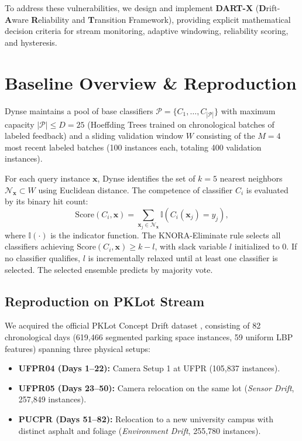 \documentclass[conference,10pt]{IEEEtran}
\begin{document}
To address these vulnerabilities, we design and implement \textbf{DART-X} (\textbf{D}rift-\textbf{A}ware \textbf{R}eliability and \textbf{T}ransition Framework), providing explicit mathematical decision criteria for stream monitoring, adaptive windowing, reliability scoring, and hysteresis.

\section{Baseline Overview \& Reproduction}
\label{sec:baseline}
Dynse \cite{almeida2018adapting} maintains a pool of base classifiers $\mathcal{P} = \{C_1, \dots, C_{|\mathcal{P}|}\}$ with maximum capacity $|\mathcal{P}| \le D = 25$ (Hoeffding Trees trained on chronological batches of labeled feedback) and a sliding validation window $W$ consisting of the $M = 4$ most recent labeled batches (100 instances each, totaling 400 validation instances).

For each query instance $\mathbf{x}$, Dynse identifies the set of $k = 5$ nearest neighbors $\mathcal{N}_{\mathbf{x}} \subset W$ using Euclidean distance. The competence of classifier $C_i$ is evaluated by its binary hit count:
\begin{equation}
    \text{Score}(C_i, \mathbf{x}) = \sum_{\mathbf{x}_j \in \mathcal{N}_{\mathbf{x}}} \mathbb{I}\left(C_i(\mathbf{x}_j) = y_j\right),
\end{equation}
where $\mathbb{I}(\cdot)$ is the indicator function. The KNORA-Eliminate rule selects all classifiers achieving $\text{Score}(C_i, \mathbf{x}) \ge k - l$, with slack variable $l$ initialized to 0. If no classifier qualifies, $l$ is incrementally relaxed until at least one classifier is selected. The selected ensemble predicts by majority vote.

\subsection{Reproduction on PKLot Stream}
We acquired the official PKLot Concept Drift dataset \cite{almeida2015pklot, almeida2018adapting}, consisting of 82 chronological days (619,466 segmented parking space instances, 59 uniform LBP features) spanning three physical setups:
\begin{itemize}
    \item \textbf{UFPR04 (Days 1--22):} Camera Setup 1 at UFPR (105,837 instances).
    \item \textbf{UFPR05 (Days 23--50):} Camera relocation on the same lot (\textit{Sensor Drift}, 257,849 instances).
    \item \textbf{PUCPR (Days 51--82):} Relocation to a new university campus with distinct asphalt and foliage (\textit{Environment Drift}, 255,780 instances).
\end{itemize}
\end{document}

